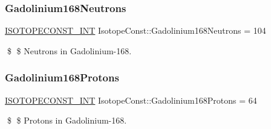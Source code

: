\subsubsection{\texorpdfstring{Gadolinium168\+Neutrons}{Gadolinium168Neutrons}}
{\footnotesize\ttfamily \mbox{\hyperlink{group___isotope_const-_macros_ga5f18360b3e99483a35c32d789e62621c}{I\+S\+O\+T\+O\+P\+E\+C\+O\+N\+S\+T\+\_\+\+I\+NT}} Isotope\+Const\+::\+Gadolinium168\+Neutrons = 104}

\$ \$ Neutrons in Gadolinium-\/168. \mbox{\label{group___isotope_const-_gadolinium-_gd168_ga0e74b89b7720b1d06738f972f8d3cf7a}} 
\subsubsection{\texorpdfstring{Gadolinium168\+Protons}{Gadolinium168Protons}}
{\footnotesize\ttfamily \mbox{\hyperlink{group___isotope_const-_macros_ga5f18360b3e99483a35c32d789e62621c}{I\+S\+O\+T\+O\+P\+E\+C\+O\+N\+S\+T\+\_\+\+I\+NT}} Isotope\+Const\+::\+Gadolinium168\+Protons = 64}

\$ \$ Protons in Gadolinium-\/168. 